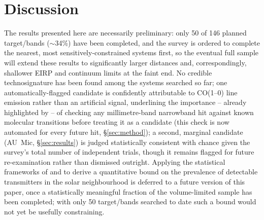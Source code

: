 \documentclass{openjournal}
\begin{document}
\section{Discussion}
\label{sec:discussion}

The results presented here are necessarily preliminary: only 50 of 146
planned target/bands ($\sim$34\%) have been completed, and the survey is
ordered to complete the nearest, most sensitively-constrained systems
first, so the eventual full sample will extend these results to
significantly larger distances and, correspondingly, shallower EIRP and
continuum limits at the faint end. No credible technosignature has been
found among the systems searched so far; one automatically-flagged
candidate is confidently attributable to CO(1--0) line emission rather
than an artificial signal, underlining the importance -- already
highlighted by \citet{Mason2024} -- of checking any millimetre-band
narrowband hit against known molecular transitions before treating it as
a candidate (this check is now automated for every future hit,
\S\ref{sec:method}); a second, marginal candidate (AU~Mic,
\S\ref{sec:results}) is judged statistically consistent with chance
given the survey's total number of independent trials, though it remains
flagged for future re-examination rather than dismissed outright.
Applying the statistical frameworks of
\citet{Wright2018} and \citet{Margot2023} to derive a quantitative bound
on the prevalence of detectable transmitters in the solar neighbourhood
is deferred to a future version of this paper, once a statistically
meaningful fraction of the volume-limited sample has been completed;
with only 50 target/bands searched to date such a bound would not yet be
usefully constraining.
\end{document}
